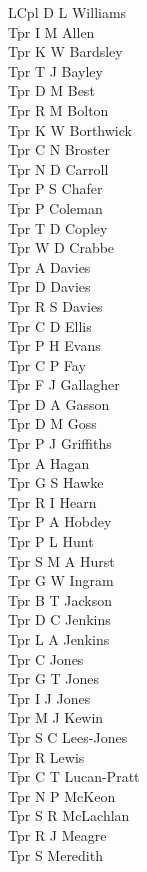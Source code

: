 \begin{multicols}{2}
  LCpl D L Williams \\
  Tpr I M Allen \\
  Tpr K W Bardsley \\
  Tpr T J Bayley \\
  Tpr D M Best \\
  Tpr R M Bolton \\
  Tpr K W Borthwick \\
  Tpr C N Broster \\
  Tpr N D Carroll \\
  Tpr P S Chafer \\
  Tpr P Coleman \\
  Tpr T D Copley \\
  Tpr W D Crabbe \\
  Tpr A Davies \\
  Tpr D Davies \\
  Tpr R S Davies \\
  Tpr C D Ellis \\
  Tpr P H Evans \\
  Tpr C P Fay \\
  Tpr F J Gallagher \\
  Tpr D A Gasson \\
  Tpr D M Goss \\
  Tpr P J Griffiths \\
  Tpr A Hagan \\
  Tpr G S Hawke \\
  Tpr R I Hearn \\
  Tpr P A Hobdey \\
  Tpr P L Hunt \\
  Tpr S M A Hurst \\
  Tpr G W Ingram \\
  Tpr B T Jackson \\
  Tpr D C Jenkins \\
  Tpr L A Jenkins \\
  Tpr C Jones \\
  Tpr G T Jones \\
  Tpr I J Jones \\
  Tpr M J Kewin \\
  Tpr S C Lees-Jones \\
  Tpr R Lewis \\
  Tpr C T Lucan-Pratt \\
  Tpr N P McKeon \\
  Tpr S R McLachlan \\
  Tpr R J Meagre \\
  Tpr S Meredith \\

\end{multicols}

